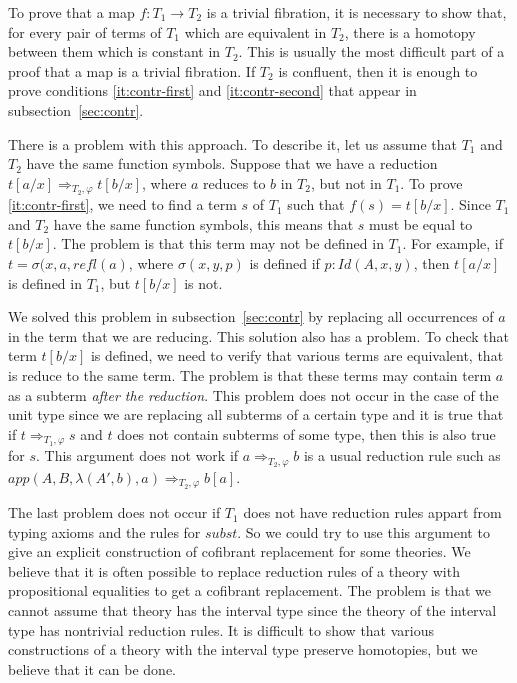 \documentclass[reqno]{amsart}
\theoremstyle{definition}
\theoremstyle{remark}
\newcommand{\Id}{\mathit{Id}}
\newcommand{\app}{\mathit{app}}
\newcommand{\refl}{\mathit{refl}}
\newcommand{\subst}{\mathit{subst}}
\numberwithin{figure}{section}
\begin{document}
To prove that a map $f : T_1 \to T_2$ is a trivial fibration, it is necessary to show that, for every pair of terms of $T_1$ which are equivalent in $T_2$, there is a homotopy between them which is constant in $T_2$.
This is usually the most difficult part of a proof that a map is a trivial fibration.
If $T_2$ is confluent, then it is enough to prove conditions \eqref{it:contr-first} and \eqref{it:contr-second} that appear in subsection~\ref{sec:contr}.

There is a problem with this approach.
To describe it, let us assume that $T_1$ and $T_2$ have the same function symbols.
Suppose that we have a reduction $t[a/x] \Rightarrow_{T_2,\varphi} t[b/x]$, where $a$ reduces to $b$ in $T_2$, but not in $T_1$.
To prove \eqref{it:contr-first}, we need to find a term $s$ of $T_1$ such that $f(s) = t[b/x]$.
Since $T_1$ and $T_2$ have the same function symbols, this means that $s$ must be equal to $t[b/x]$.
The problem is that this term may not be defined in $T_1$.
For example, if $t = \sigma(x,a,\refl(a)$, where $\sigma(x,y,p)$ is defined if $p : \Id(A,x,y)$, then $t[a/x]$ is defined in $T_1$, but $t[b/x]$ is not.

We solved this problem in subsection~\ref{sec:contr} by replacing all occurrences of $a$ in the term that we are reducing.
This solution also has a problem.
To check that term $t[b/x]$ is defined, we need to verify that various terms are equivalent, that is reduce to the same term.
The problem is that these terms may contain term $a$ as a subterm \emph{after the reduction}.
This problem does not occur in the case of the unit type since we are replacing all subterms of a certain type
and it is true that if $t \Rightarrow_{T_1,\varphi} s$ and $t$ does not contain subterms of some type, then this is also true for $s$.
This argument does not work if $a \Rightarrow_{T_2,\varphi} b$ is a usual reduction rule such as $\app(A,B,\lambda(A',b),a) \Rightarrow_{T_2,\varphi} b[a]$.

The last problem does not occur if $T_1$ does not have reduction rules appart from typing axioms and the rules for $\subst$.
So we could try to use this argument to give an explicit construction of cofibrant replacement for some theories.
We believe that it is often possible to replace reduction rules of a theory with propositional equalities to get a cofibrant replacement.
The problem is that we cannot assume that theory has the interval type since the theory of the interval type has nontrivial reduction rules.
It is difficult to show that various constructions of a theory with the interval type preserve homotopies, but we believe that it can be done.
\end{document}
